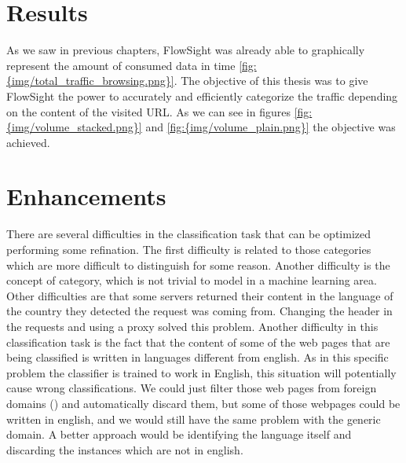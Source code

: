 

\section{Results}

As we saw in previous chapters, FlowSight was already able to graphically represent the amount of consumed data in time \ref{fig:{img/total_traffic_browsing.png}}. The objective of this thesis was to
give FlowSight the power to accurately and efficiently categorize the traffic depending on the content of the visited URL. As we can see in figures \ref{fig:{img/volume_stacked.png}} and 
\ref{fig:{img/volume_plain.png}} the objective was achieved.
 
\clearpage
{}




\section{Enhancements}

There are several difficulties in the classification task that can be optimized performing some refination. 
The first difficulty is related to those categories which are more difficult to distinguish for some reason. Another difficulty is the concept of  category, which is not trivial to
model in a machine learning area.
Other difficulties are that some servers returned their content in the language of the country they detected the request was coming from. Changing the header in the requests and using a proxy 
solved this problem.  
Another difficulty in this classification task is the fact that the content of some of the web pages that are being classified is written in languages different from english. 
As in this specific problem the classifier is trained to work in English, this situation will potentially cause wrong classifications. 
We could just filter those web pages from foreign domains () and automatically discard them, but some of those webpages could be written in english, and we would still have the same 
problem with the generic  domain.
A better approach would be identifying the language itself and discarding the instances  which are not in english.


